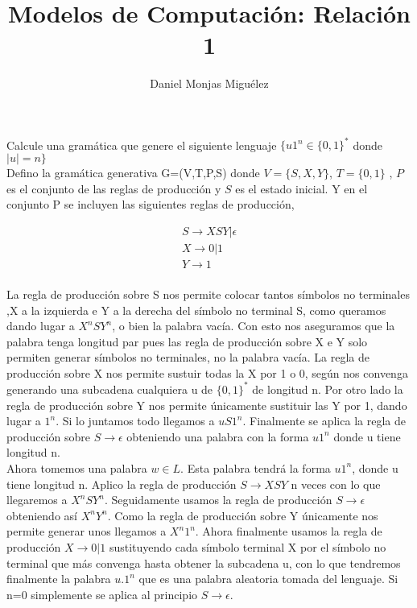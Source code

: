 \documentclass[a4paper,11pt]{article}
\author{Daniel Monjas Miguélez}
\title{Modelos de Computación: Relación 1}
\begin{document}
\maketitle
\newpage

Calcule una gramática que genere el siguiente lenguaje $\{u1^n \in \{0,1\}^*$ donde $|u| = n\}$ \\

Defino la gramática generativa G=(V,T,P,S) donde $V=\{S,X,Y\}$, $T=\{0,1\}$ , $P$ es el conjunto de las reglas de producción y $S$ es el estado inicial. Y en el conjunto P se incluyen las siguientes reglas de producción,

\begin{align*}
S \rightarrow XSY|\epsilon  \\
X \rightarrow 0|1 \\
Y \rightarrow 1 \\
\end{align*}

La regla de producción sobre S nos permite colocar tantos símbolos no terminales ,X a la izquierda e Y a la derecha del símbolo no terminal S, como queramos dando lugar a $X^nSY^n$, o bien la palabra vacía. Con esto nos aseguramos que la palabra tenga longitud par pues las regla de producción sobre X e Y solo permiten generar símbolos no terminales, no la palabra vacía. La regla de producción sobre X nos permite sustuir todas la X por 1 o 0, según nos convenga generando una subcadena cualquiera u de $\{0,1\}^*$ de longitud n. Por otro lado la regla de producción sobre Y nos permite únicamente sustituir las Y por 1, dando lugar a $1^n$. Si lo juntamos todo llegamos a $uS1^n$. Finalmente se aplica la regla de producción sobre $S \rightarrow \epsilon$ obteniendo una palabra con la forma $u1^n$ donde u tiene longitud n. \\

Ahora tomemos una palabra $w \in L$. Esta palabra tendrá la forma $u1^n$, donde u tiene longitud n. Aplico la regla de producción $S \rightarrow XSY$ n veces con lo que llegaremos a $X^nSY^n$. Seguidamente usamos la regla de producción $S \rightarrow \epsilon$ obteniendo así $X^nY^n$. Como la regla de producción sobre Y únicamente nos permite generar unos llegamos a $X^n1^n$. Ahora finalmente usamos la regla de producción $X \rightarrow 0|1$ sustituyendo cada símbolo terminal X por el símbolo no terminal que más convenga hasta obtener la subcadena u, con lo que tendremos finalmente la palabra $u.1^n$ que es una palabra aleatoria tomada del lenguaje. Si n=0 simplemente se aplica al principio $S \rightarrow \epsilon$.
\end{document}
